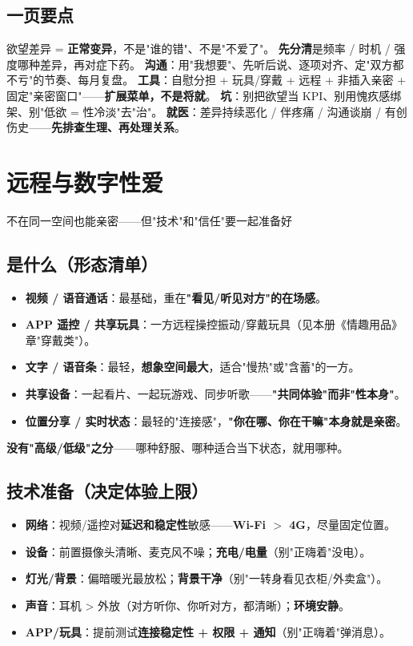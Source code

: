 \documentclass[12pt,UTF8,openany]{ctexbook}
\begin{document}
\section{一页要点}
欲望差异 = \textbf{正常变异}，不是"谁的错"、不是"不爱了"。
\textbf{先分清}是频率 / 时机 / 强度哪种差异，再对症下药。
\textbf{沟通}：用"我想要"、先听后说、逐项对齐、定"双方都不亏"的节奏、每月复盘。
\textbf{工具}：自慰分担 + 玩具/穿戴 + 远程 + 非插入亲密 + 固定"亲密窗口"——\textbf{扩展菜单，不是将就}。
\textbf{坑}：别把欲望当 KPI、别用愧疚感绑架、别"低欲 = 性冷淡"去"治"。
\textbf{就医}：差异持续恶化 / 伴疼痛 / 沟通谈崩 / 有创伤史——\textbf{先排查生理、再处理关系}。


\chapter{远程与数字性爱}

\begin{center}
\myhei\large 不在同一空间也能亲密——但"技术"和"信任"要一起准备好
\end{center}

\section{是什么（形态清单）}
\begin{itemize}[leftmargin=2em,itemsep=0.3em]
  \item \textbf{视频 / 语音通话}：最基础，重在\textbf{"看见/听见对方"的在场感}。
  \item \textbf{APP 遥控 / 共享玩具}：一方远程操控振动/穿戴玩具（见本册《情趣用品》章"穿戴类"）。
  \item \textbf{文字 / 语音条}：最轻，\textbf{想象空间最大}，适合"慢热"或"含蓄"的一方。
  \item \textbf{共享设备}：一起看片、一起玩游戏、同步听歌——\textbf{"共同体验"而非"性本身"}。
  \item \textbf{位置分享 / 实时状态}：最轻的"连接感"，\textbf{"你在哪、你在干嘛"本身就是亲密}。
\end{itemize}
\textbf{没有"高级/低级"之分}——哪种舒服、哪种适合当下状态，就用哪种。

\section{技术准备（决定体验上限）}
\begin{itemize}[leftmargin=2em,itemsep=0.3em]
  \item \textbf{网络}：视频/遥控对\textbf{延迟和稳定性}敏感——\textbf{Wi-Fi $>$ 4G}，尽量固定位置。
  \item \textbf{设备}：前置摄像头清晰、麦克风不噪；\textbf{充电/电量}（别"正嗨着"没电）。
  \item \textbf{灯光/背景}：偏暗暖光最放松；\textbf{背景干净}（别"一转身看见衣柜/外卖盒"）。
  \item \textbf{声音}：耳机 > 外放（对方听你、你听对方，都清晰）；\textbf{环境安静}。
  \item \textbf{APP/玩具}：提前测试\textbf{连接稳定性 + 权限 + 通知}（别"正嗨着"弹消息）。
\end{itemize}
\end{document}
